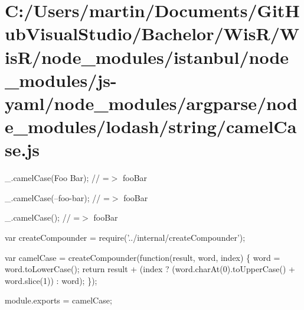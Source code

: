 \hypertarget{_c_1_2_users_2martin_2_documents_2_git_hub_visual_studio_2_bachelor_2_wis_r_2_wis_r_2node_moduled3d43384178532de2e575ee925720b4c}{}\section{C\+:/\+Users/martin/\+Documents/\+Git\+Hub\+Visual\+Studio/\+Bachelor/\+Wis\+R/\+Wis\+R/node\+\_\+modules/istanbul/node\+\_\+modules/js-\/yaml/node\+\_\+modules/argparse/node\+\_\+modules/lodash/string/camel\+Case.\+js}
\+\_\+.\+camel\+Case(\textquotesingle{}Foo Bar\textquotesingle{}); // =$>$ \textquotesingle{}foo\+Bar\textquotesingle{}

\+\_\+.\+camel\+Case(\textquotesingle{}--foo-\/bar\textquotesingle{}); // =$>$ \textquotesingle{}foo\+Bar\textquotesingle{}

\+\_\+.\+camel\+Case(\textquotesingle{}); // =$>$ \textquotesingle{}foo\+Bar\textquotesingle{}


\begin{DoxyCodeInclude}
var createCompounder = require(\textcolor{stringliteral}{'../internal/createCompounder'});

var camelCase = createCompounder(\textcolor{keyword}{function}(result, word, index) \{
  word = word.toLowerCase();
  \textcolor{keywordflow}{return} result + (index ? (word.charAt(0).toUpperCase() + word.slice(1)) : word);
\});

module.exports = camelCase;
\end{DoxyCodeInclude}
 